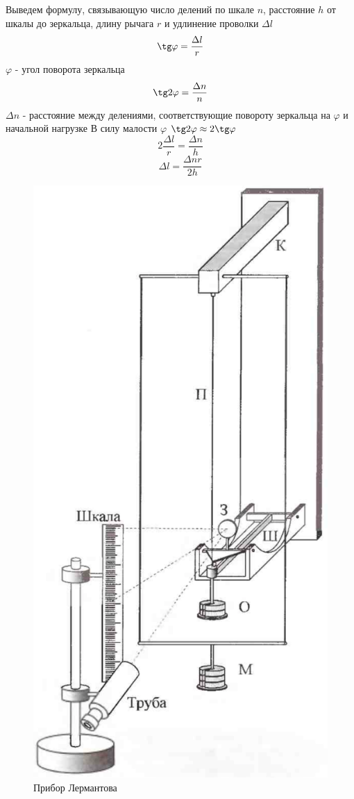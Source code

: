 \documentclass[a4paper,12pt]{article} %
\begin{document}
Выведем формулу, связывающую число делений по шкале $n$, расстояние $h$ от шкалы до зеркальца, длину рычага $r$ и удлинение проволки $\Delta l$
\[\tg\varphi = \frac{\Delta l}{r}\]
$\varphi$ - угол поворота зеркальца
\[\tg 2\varphi = \frac{\Delta n}{n}\]
$\Delta n$ - расстояние между делениями, соответствующие повороту зеркальца на $\varphi$ и начальной нагрузке
В силу малости $\varphi$ $\tg 2\varphi \approx 2 \tg \varphi$
\[2\frac{\Delta l}{r} = \frac{\Delta n}{h}\]
\[\Delta l = \frac{\Delta n r}{2h}\]
\begin{figure}[!h]
\centering
\includegraphics[scale=0.3]{1}
\caption{Прибор Лермантова}
\end{figure}
\newpage
\end{document}
